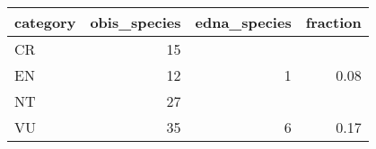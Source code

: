 \begin{longtable}{lrrr}
  \hline
category & obis\_species & edna\_species & fraction \\ 
  \hline
CR &  15 &  &  \\ 
  EN &  12 &   1 & 0.08 \\ 
  NT &  27 &  &  \\ 
  VU &  35 &   6 & 0.17 \\ 
   \hline
\hline
\end{longtable}
